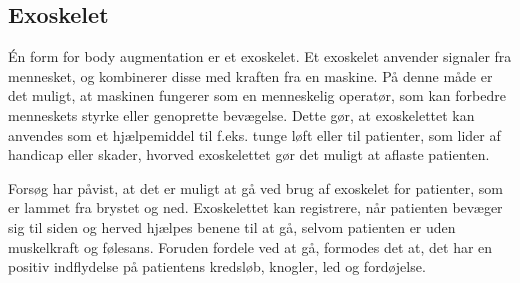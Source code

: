 \subsection{Exoskelet}
Én form for body augmentation er et exoskelet. Et exoskelet  anvender signaler fra mennesket, og kombinerer disse med kraften fra en maskine. På denne måde er det muligt, at maskinen fungerer som en menneskelig operatør, som kan forbedre menneskets styrke eller genoprette bevægelse. \citep{yang2008} Dette gør, at exoskelettet kan anvendes som et hjælpemiddel til f.eks. tunge løft eller til patienter, som lider af handicap eller skader, hvorved exoskelettet gør det muligt at aflaste patienten. \citep{bogue2015} 

Forsøg har påvist, at det er muligt at gå ved brug af exoskelet for patienter, som er lammet fra brystet og ned. Exoskelettet kan registrere, når patienten bevæger sig til siden og herved hjælpes benene til at gå, selvom patienten er uden muskelkraft og følesans. Foruden fordele ved at gå, formodes det at, det har en positiv indflydelse på patientens kredsløb, knogler, led og fordøjelse. \citep{regmidt2015}